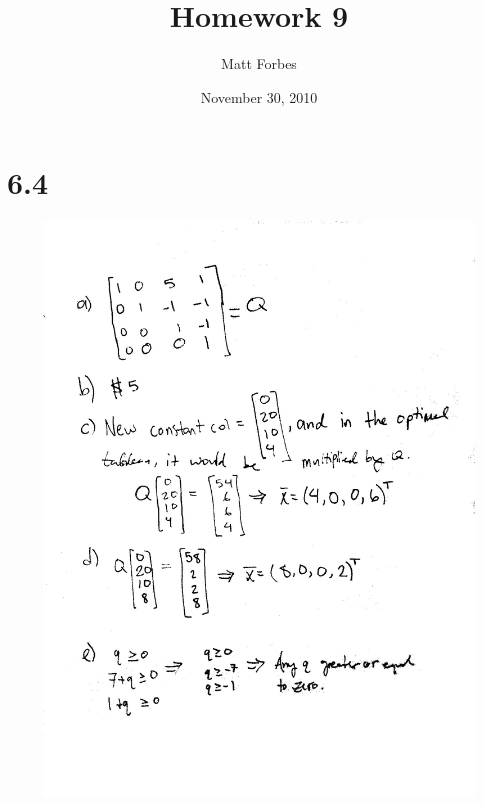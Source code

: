 \documentclass[a4paper,12pt]{article}
\begin{document}
\title{Homework 9}
\author{Matt Forbes}
\date{November 30, 2010}
\maketitle
\section*{6.4}
\begin{center}
\includegraphics[width=7in, height=6in, keepaspectratio=true]{image/sixfour1.jpg}\\

\end{center}
\end{document}
